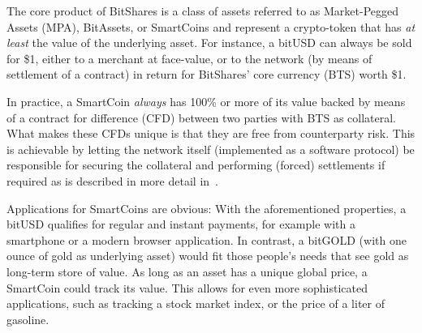The core product of BitShares is a class of assets referred to as Market-Pegged
Assets (MPA), BitAssets, or SmartCoins and represent a crypto-token that has
\emph{at least} the value of the underlying asset. For instance, a bitUSD can
always be sold for \$1, either to a merchant at face-value, or to the network
(by means of settlement of a contract) in return for BitShares' core currency
(BTS) worth \$1.

In practice, a SmartCoin \emph{always} has 100\% or more of its value backed by
means of a contract for difference (CFD) between two parties with BTS as
collateral. What makes these CFDs unique is that they are free from
counterparty risk. This is achievable by letting the network itself
(implemented as a software protocol) be responsible for securing the collateral
and performing (forced) settlements if required as is described in more detail
in~\cite{bts:financial}.

Applications for SmartCoins are obvious: With the aforementioned properties, a
bitUSD qualifies for regular and instant payments, for example with a
smartphone or a modern browser application. In contrast, a bitGOLD (with one
ounce of gold as underlying asset) would fit those people's needs that see gold
as long-term store of value. As long as an asset has a unique global price, a
SmartCoin could track its value. This allows for even more sophisticated
applications, such as tracking a stock market index, or the price of a liter of
gasoline.
